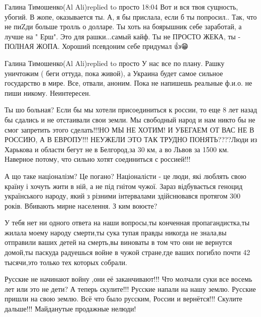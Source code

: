 {%
Галина Тимошенко(Al Ali)replied to просто
18:04
Вот и вся твоя сущность, убогий. В жопе, оказывается ты.
А, я бы прислала, если б ты попросил..
Так, что не пиZди больше тролль о долларе.
Ты хоть на боярышник себе заработай, а лучше на " Ерш". Это для рашки...самый кайф.
Ты не ПРОСТО ЖЕКА, ты - ПОЛНАЯ ЖОПА.
Хороший псевдоним себе придумал 👍😁

Галина Тимошенко(Al Ali)replied to просто
У нас все по плану. Рашку уничтожим ( беги оттуда, пока живой), а Украина будет самое сильное государство в мире.
Все, отвали, аноним.
Пока не напишешь реальные ф.и.о. не пиши никому. Неинтересен.

Ты шо больная? Если бы мы хотели присоединиться к россии, то еще 8 лет назад бы
сдались и не отстаивали свои земли. Мы свободный народ и нам никто бы не смог
запретить этого сделать!!!НО МЫ НЕ ХОТИМ! И УБЕГАЕМ ОТ ВАС НЕ В РОССИЮ, А В
ЕВРОПУ!!! НЕУЖЕЛИ ЭТО ТАК ТРУДНО ПОНЯТЬ????Люди из Харькова и области бегут не
в Белгород,за 30 км, а во Львов за 1500 км. Наверное потому, что сильно хотят
соединиться с россией!!!


А що таке націоналізм? Це погано? Націоналісти - це люди, які люблять свою
країну і хочуть жити в ній, а не під гнітом чужої. Зараз відбувається геноцид
українського народу, який з різними інтервалами здійснювався протягом 300
років. Вбивають мирне населення. З ким воюєте?


У тебя нет ни одного ответа на наши вопросы,ты конченная пропагандистка,ты
жилала моему народу смерти,ты сука тупая правды никогда не знала,вы отправили
ваших детей на смерть,вы виноваты в том что они не вернутся домой,ты паскуда
радуешься войне в чужой стране,где ваших погибло почти 42 тысячи,это только тех
которых собрали.


Русские не начинают войну ,они её заканчивают!!! Что молчали суки все восемь
лет или это не дети? А теперь скулите!!! Русские напали на нашу землю. Русские
пришли на свою землю. Всё что было русским, России и вернётся!!! Скулите
дальше!!! Майданутые продажные нелюди!


}
